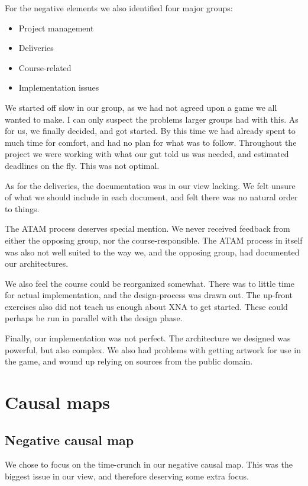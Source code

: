 \documentclass[titlepage,a4paper,11pt]{article}
\begin{document}
For the negative elements we also identified four major groups:

\begin{itemize}
    \item Project management
    \item Deliveries
    \item Course-related
    \item Implementation issues
\end{itemize}

We started off slow in our group, as we had not agreed upon a game we all
wanted to make. I can only suspect the problems larger groups had with
this. As for us, we finally decided, and got started. By this time we had
already spent to much time for comfort, and had no plan for what was to
follow.  Throughout the project we were working with what our gut told us
was needed, and estimated deadlines on the fly. This was not optimal.

As for the deliveries, the documentation was in our view lacking. We felt
unsure of what we should include in each document, and felt there was no
natural order to things.

The ATAM process deserves special mention. We never received feedback from
either the opposing group, nor the course-responsible. The ATAM process in
itself was also not well suited to the way we, and the opposing group, had
documented our architectures.

We also feel the course could be reorganized somewhat. There was to little
time for actual implementation, and the design-process was drawn out.
The up-front exercises also did not teach us enough about XNA to get 
started. These could perhaps be run in parallel with the design phase.

Finally, our implementation was not perfect. The architecture we designed
was powerful, but also complex. We also had problems with getting artwork
for use in the game, and wound up relying on sources from the public
domain.

\section{Causal maps}

\subsection{Negative causal map}
We chose to focus on the time-crunch in our negative causal map. This was
the biggest issue in our view, and therefore deserving some extra focus.
\end{document}

